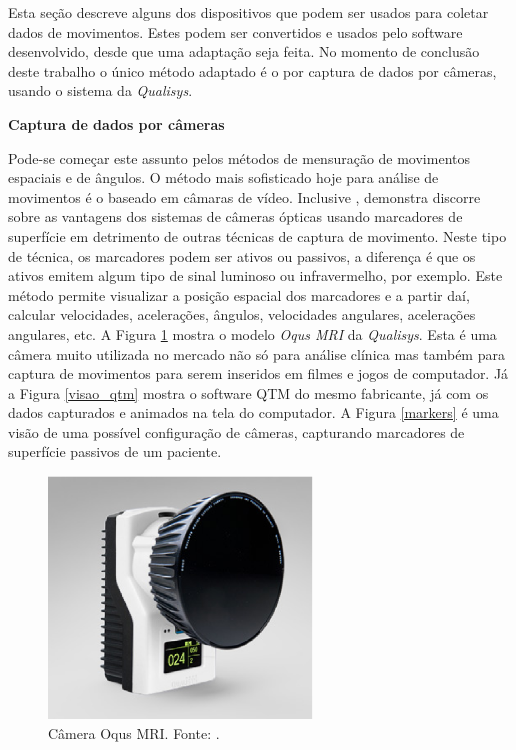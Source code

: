 Esta seção descreve alguns dos dispositivos que podem ser usados para coletar dados de movimentos. 
Estes podem ser convertidos e usados pelo software desenvolvido, desde que uma adaptação seja feita. 
No momento de conclusão deste trabalho o único método adaptado é o por captura de dados por câmeras, usando o sistema da \emph{Qualisys}.

\textbf{Captura de dados por câmeras}

\noindent
Pode-se começar este assunto pelos métodos de mensuração de movimentos espaciais e de ângulos.
O método mais sofisticado hoje para análise de movimentos é o baseado em câmaras de vídeo. 
Inclusive , demonstra discorre sobre as vantagens dos sistemas de câmeras ópticas usando marcadores de superfície em detrimento de outras técnicas de captura de movimento. 
Neste tipo de técnica, os marcadores podem ser ativos ou passivos, a diferença é que os ativos emitem algum tipo de sinal luminoso ou infravermelho, por exemplo. 
Este método permite visualizar a posição espacial dos marcadores e a partir daí, calcular velocidades, acelerações, ângulos, velocidades angulares, acelerações angulares, etc.
A Figura \ref{oqus_mri} mostra o modelo \emph{Oqus MRI} da \emph{Qualisys}. Esta é uma câmera muito utilizada no mercado não só para análise clínica mas também para captura de movimentos para serem inseridos em filmes e jogos de computador. 
Já a Figura \ref{visao_qtm} mostra o software QTM do mesmo fabricante, já com os dados capturados e animados na tela do computador.
A Figura \ref{markers} é uma visão de uma possível configuração de câmeras, capturando marcadores de superfície passivos de um paciente.

\begin{figure}[H]
	\centering
	\includegraphics[width=7cm]{figuras/oqus-mri.eps}
	\caption{Câmera Oqus MRI. Fonte: .
}
	\label{oqus_mri}
\end{figure}


